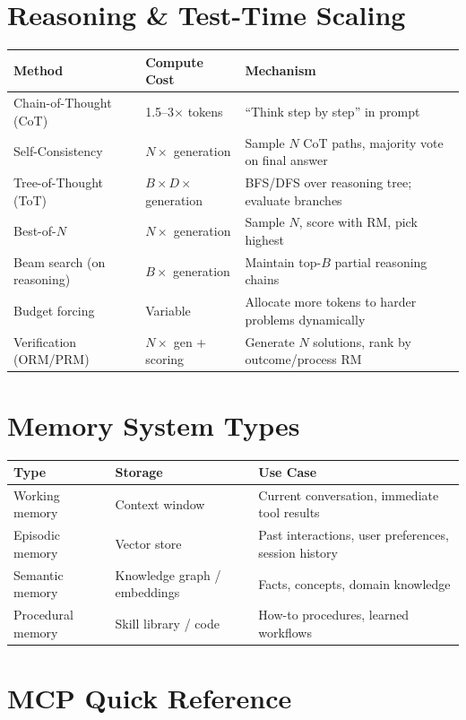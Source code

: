 \section{Reasoning \& Test-Time Scaling}
\label{reasoning-test-time-scaling}

\begin{tabular}{@{}lp{5cm}p{8cm}@{}}
\toprule
\textbf{Method} & \textbf{Compute Cost} & \textbf{Mechanism} \\
\midrule
Chain-of-Thought (CoT) & 1.5--3$\times$ tokens & ``Think step by step'' in prompt \\
Self-Consistency & $N \times$ generation & Sample $N$ CoT paths, majority vote on final answer \\
Tree-of-Thought (ToT) & $B \times D \times$ generation & BFS/DFS over reasoning tree; evaluate branches \\
Best-of-$N$ & $N \times$ generation & Sample $N$, score with RM, pick highest \\
Beam search (on reasoning) & $B \times$ generation & Maintain top-$B$ partial reasoning chains \\
Budget forcing & Variable & Allocate more tokens to harder problems dynamically \\
Verification (ORM/PRM) & $N \times$ gen + scoring & Generate $N$ solutions, rank by outcome/process RM \\
\bottomrule
\end{tabular}

\section{Memory System Types}
\label{memory-system-types}

\begin{tabular}{@{}lp{5cm}p{8cm}@{}}
\toprule
\textbf{Type} & \textbf{Storage} & \textbf{Use Case} \\
\midrule
Working memory & Context window & Current conversation, immediate tool results \\
Episodic memory & Vector store & Past interactions, user preferences, session history \\
Semantic memory & Knowledge graph / embeddings & Facts, concepts, domain knowledge \\
Procedural memory & Skill library / code & How-to procedures, learned workflows \\
\bottomrule
\end{tabular}

\section{MCP Quick Reference}
\label{mcp-quick-reference}


